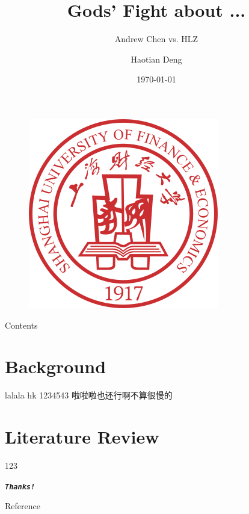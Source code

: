 \documentclass[UTF8, 16pt]{beamer}
\author[Haotian Deng] %
{
Haotian Deng
}
\title[Gods' Fight about ...]{Gods' Fight about ...}
\subtitle{Andrew Chen vs. HLZ}
\institute[SUFE]
{
Shanghai University of Finance and Economics
}
\date[VLC 2021]
{\today}
\begin{document}
\begin{CJK*}{UTF8}{gbsn}

\begin{frame}[noframenumbering]
	\titlepage
	\vspace{-0.5cm}
    \begin{figure}[htpb] 
        \begin{center}
            \includegraphics[width=0.19 \linewidth]{sufe_logo.png}
        \end{center}  
    \end{figure}
\end{frame}

\begin{frame}{Contents}
	\tableofcontents[sectionstyle=show,
 	subsectionstyle=show/shaded/hide,
 	subsubsectionstyle=show/shaded/hide]
\end{frame}

\section{Background}

\begin{frame}{lalala}
	\textcolor{sufered}{hk}
	1234543
	\cite{Greiner2008}
	啦啦啦也还行啊不算很慢的
\end{frame}

\section{Literature Review}
\begin{frame}
	123
\end{frame}



\begin{frame}[allowframebreaks]%
	\begin{center}
		\Huge\textbf{\textit{\texttt{Thanks!}}}
	\end{center}
\end{frame}

\begin{frame}{Reference}
	\addtocounter{framenumber}{-1}
	\printbibliography %
\end{frame}


\end{CJK*}
\end{document}
